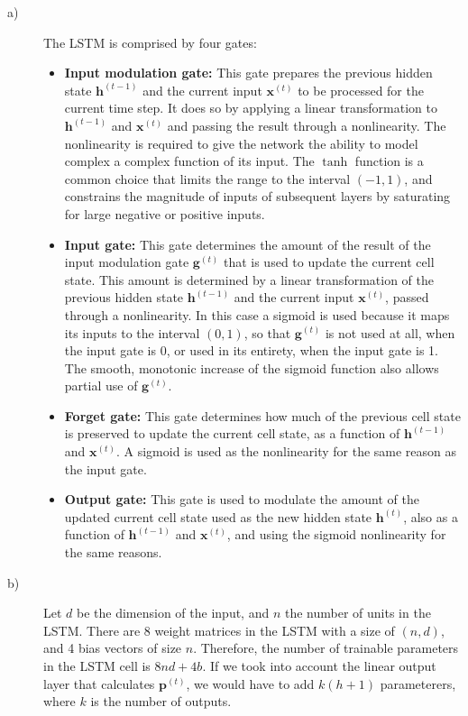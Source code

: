\documentclass{article}
\begin{document}
\begin{description}
\item[a)] The LSTM is comprised by four gates:
\begin{itemize}
\item \textbf{Input modulation gate:} This gate prepares the previous hidden state $\mathbf{h}^{(t-1)}$ and the current input $\mathbf{x}^{(t)}$ to be processed for the current time step. It does so by applying a linear transformation to $\mathbf{h}^{(t-1)}$ and $\mathbf{x}^{(t)}$ and passing the result through a nonlinearity. The nonlinearity is required to give the network the ability to model complex a complex function of its input. The $\tanh$ function is a common choice that limits the range to the interval $(-1, 1)$, and constrains the magnitude of inputs of subsequent layers by saturating for large negative or positive inputs.
\item \textbf{Input gate:} This gate determines the amount of the result of the input modulation gate $\mathbf{g}^{(t)}$ that is used to update the current cell state. This amount is determined by a linear transformation of the previous hidden state $\mathbf{h}^{(t-1)}$ and the current input $\mathbf{x}^{(t)}$, passed through a nonlinearity. In this case a sigmoid is used because it maps its inputs to the interval $(0,1)$, so that $\mathbf{g}^{(t)}$ is not used at all, when the input gate is 0, or used in its entirety, when the input gate is 1. The smooth, monotonic increase of the sigmoid function also allows partial use of $\mathbf{g}^{(t)}$.
\item \textbf{Forget gate:} This gate determines how much of the previous cell state is preserved to update the current cell state, as a function of $\mathbf{h}^{(t-1)}$ and $\mathbf{x}^{(t)}$. A sigmoid is used as the nonlinearity for the same reason as the input gate.
\item \textbf{Output gate:} This gate is used to modulate the amount of the updated current cell state used as the new hidden state $\mathbf{h}^{(t)}$, also as a function of $\mathbf{h}^{(t-1)}$ and $\mathbf{x}^{(t)}$, and using the sigmoid nonlinearity for the same reasons.
\end{itemize}

\item[b)] Let $d$ be the dimension of the input, and $n$ the number of units in the LSTM. There are 8 weight matrices in the LSTM with a size of $(n, d)$, and 4 bias vectors of size $n$. Therefore, the number of trainable parameters in the LSTM cell is $8nd + 4b$. If we took into account the linear output layer that calculates $\mathbf{p}^{(t)}$, we would have to add $k(h + 1)$ parameterers, where $k$ is the number of outputs.
\end{description}
\end{document}
